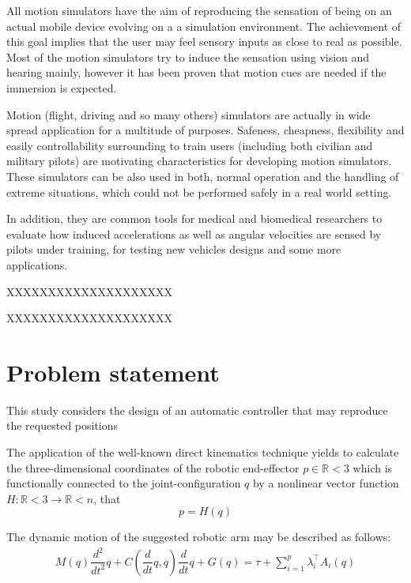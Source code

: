 \documentclass[journal,twocolumn]{IEEEtran}
\newcommand{\dsum} {\displaystyle\sum}
\begin{document}
All motion simulators have the aim of reproducing the sensation of being on an actual mobile device evolving on a a simulation environment. The achievement of this goal implies that the user may feel sensory inputs as close to real as possible. Most of the motion simulators try to induce the sensation using vision and hearing mainly, however it has been proven that motion cues are needed if the immersion is expected.

Motion (flight, driving and so many others) simulators are actually in wide spread application for a multitude of purposes. Safeness, cheapness, flexibility and easily controllability surrounding to train users (including both civilian and military pilots) are motivating characteristics for developing motion simulators. These simulators can be also used in both, normal operation and the handling of extreme situations, which could not be performed safely in a real world setting.

In addition, they are common tools for medical and biomedical researchers to evaluate how induced accelerations as well as angular velocities are sensed by pilots under training, for testing new vehicles designs and some more applications. 



XXXXXXXXXXXXXXXXXXXX

XXXXXXXXXXXXXXXXXXXX



\section{Problem statement}

This study considers the design of an automatic controller that may reproduce the requested positions 

The application of the well-known direct kinematics technique yields to calculate the three-dimensional coordinates of the robotic end-effector $p \in \mathbb{R}<{3}$ which is functionally connected to the joint-configuration $q$ by a nonlinear vector function $H : \mathbb{R}<{3} \rightarrow \mathbb{R}<{n} $, that 
%
\begin{equation}
    p =H(q) 
\end{equation}

The dynamic motion of the suggested robotic arm may be described as follows:
%
\begin{equation}
    \begin{array}{c}
         M\left( q \right) \dfrac{d^2 }{d t^2} q+  C\left( \dfrac{d }{d t} q , q \right) \dfrac{d }{d t} q + G(q) = \tau + \dsum_{i = 1}^{p} \lambda^{\top}_{i} A_{i} \left( q \right)     \end{array}
         \label{DynamicModel}
\end{equation}
\end{document}
